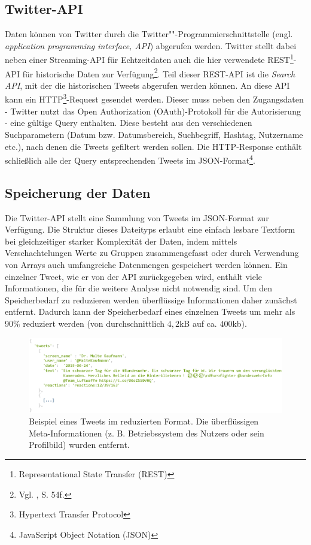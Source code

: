 \documentclass[
	a4paper,
	12pt,
	bibliography=totocnumbered,
	twoside,
]{scrreprt}
\begin{document}
\subsection*{Twitter-API}
Daten können von Twitter durch die Twitter""-Programmierschnittstelle (engl. \textit{application programming interface, API}) abgerufen werden. Twitter stellt dabei neben einer Streaming-API für Echtzeitdaten auch die hier verwendete REST\footnote{Representational State Transfer (REST)}-API für historische Daten zur Verfügung\footnote{Vgl. \citet{pfaffenberger2016}, S. 54f.}. Teil dieser REST-API ist die \textit{Search API}, mit der die historischen Tweets abgerufen werden können. An diese API kann ein HTTP\footnote{Hypertext Transfer Protocol}-Request gesendet werden. Dieser muss neben den Zugangsdaten - Twitter nutzt das Open Authorization (OAuth)-Protokoll für die Autorisierung - eine gültige Query enthalten. Diese besteht aus den verschiedenen Suchparametern (Datum bzw. Datumsbereich, Suchbegriff, Hashtag, Nutzername etc.), nach denen die Tweets gefiltert werden sollen. Die HTTP-Response enthält schließlich alle der Query entsprechenden Tweets im JSON-Format\footnote{JavaScript Object Notation (JSON)}.\\


\subsection*{Speicherung der Daten}
\label{subsec:saving-data}
Die Twitter-API stellt eine Sammlung von Tweets im JSON-Format zur Verfügung. Die Struktur dieses Dateityps erlaubt eine einfach lesbare Textform bei gleichzeitiger starker Komplexität der Daten, indem mittels Verschachtelungen Werte zu Gruppen zusammengefasst oder durch Verwendung von Arrays auch umfangreiche Datenmengen gespeichert werden können. Ein einzelner Tweet, wie er von der API zurückgegeben wird, enthält viele Informationen, die für die weitere Analyse nicht notwendig sind. Um den Speicherbedarf zu reduzieren werden überflüssige Informationen daher zunächst entfernt. Dadurch kann der Speicherbedarf eines einzelnen Tweets um mehr als 90\% reduziert werden (von durchschnittlich $4,2$kB auf ca. $400$kb). \\

\begin{figure}[hbt!]
	\centering
	\includegraphics[width=.9\textwidth]{images/reduced_tweet_json.eps}
	\caption[Beispiel eines Tweets im reduzierten Format]{Beispiel eines Tweets im reduzierten Format. Die überflüssigen Meta-Informationen (z. B. Betriebssystem des Nutzers oder sein Profilbild) wurden entfernt\footnotemark.}
	\label{img:json-example-tweet-reduced}
\end{figure}
\end{document}
